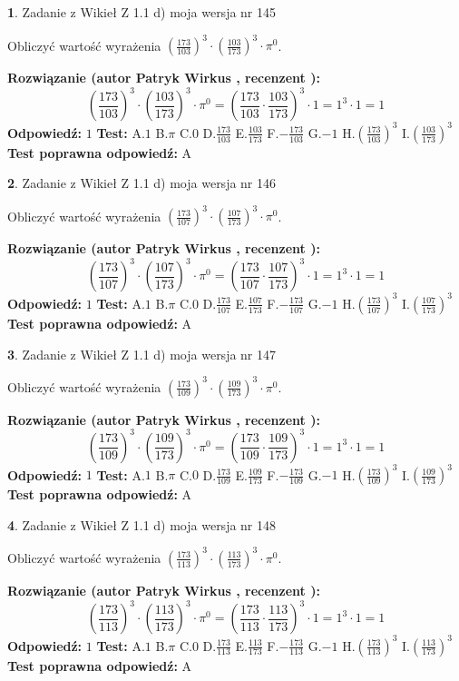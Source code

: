 \documentclass[12pt, a4paper]{article}
\theoremstyle{definition} %
\newtheorem{zad}{}
\newcommand{\zadStart}[1]{\begin{zad}#1\newline}
\newcommand{\zadStop}{\end{zad}}
\newcommand{\rozwStart}[2]{\noindent \textbf{Rozwiązanie (autor #1 , recenzent #2): }\newline}
\newcommand{\rozwStop}{\newline}
\newcommand{\odpStart}{\noindent \textbf{Odpowiedź:}\newline}
\newcommand{\odpStop}{\newline}
\newcommand{\testStart}{\noindent \textbf{Test:}\newline}
\newcommand{\testStop}{\newline}
\newcommand{\kluczStart}{\noindent \textbf{Test poprawna odpowiedź:}\newline}
\newcommand{\kluczStop}{\newline}
\begin{document}
\zadStart{Zadanie z Wikieł Z 1.1 d) moja wersja nr 145}

Obliczyć wartość wyrażenia $(\frac{173}{103})^{3} \cdot (\frac{103}{173})^{3} \cdot \pi^{0}$.
\zadStop
\rozwStart{Patryk Wirkus}{}
$$(\frac{173}{103})^{3} \cdot (\frac{103}{173})^{3} \cdot \pi^{0} = (\frac{173}{103} \cdot \frac{103}{173})^{3} \cdot 1 = 1^{3} \cdot 1 = 1$$
\rozwStop
\odpStart
$1$
\odpStop
\testStart
A.$1$ B.$\pi$ C.$0$ D.$\frac{173}{103}$ E.$\frac{103}{173}$
F.$-\frac{173}{103}$ G.$-1$
H.$(\frac{173}{103})^{3}$
I.$(\frac{103}{173})^{3}$
\testStop
\kluczStart
A
\kluczStop



\zadStart{Zadanie z Wikieł Z 1.1 d) moja wersja nr 146}

Obliczyć wartość wyrażenia $(\frac{173}{107})^{3} \cdot (\frac{107}{173})^{3} \cdot \pi^{0}$.
\zadStop
\rozwStart{Patryk Wirkus}{}
$$(\frac{173}{107})^{3} \cdot (\frac{107}{173})^{3} \cdot \pi^{0} = (\frac{173}{107} \cdot \frac{107}{173})^{3} \cdot 1 = 1^{3} \cdot 1 = 1$$
\rozwStop
\odpStart
$1$
\odpStop
\testStart
A.$1$ B.$\pi$ C.$0$ D.$\frac{173}{107}$ E.$\frac{107}{173}$
F.$-\frac{173}{107}$ G.$-1$
H.$(\frac{173}{107})^{3}$
I.$(\frac{107}{173})^{3}$
\testStop
\kluczStart
A
\kluczStop



\zadStart{Zadanie z Wikieł Z 1.1 d) moja wersja nr 147}

Obliczyć wartość wyrażenia $(\frac{173}{109})^{3} \cdot (\frac{109}{173})^{3} \cdot \pi^{0}$.
\zadStop
\rozwStart{Patryk Wirkus}{}
$$(\frac{173}{109})^{3} \cdot (\frac{109}{173})^{3} \cdot \pi^{0} = (\frac{173}{109} \cdot \frac{109}{173})^{3} \cdot 1 = 1^{3} \cdot 1 = 1$$
\rozwStop
\odpStart
$1$
\odpStop
\testStart
A.$1$ B.$\pi$ C.$0$ D.$\frac{173}{109}$ E.$\frac{109}{173}$
F.$-\frac{173}{109}$ G.$-1$
H.$(\frac{173}{109})^{3}$
I.$(\frac{109}{173})^{3}$
\testStop
\kluczStart
A
\kluczStop



\zadStart{Zadanie z Wikieł Z 1.1 d) moja wersja nr 148}

Obliczyć wartość wyrażenia $(\frac{173}{113})^{3} \cdot (\frac{113}{173})^{3} \cdot \pi^{0}$.
\zadStop
\rozwStart{Patryk Wirkus}{}
$$(\frac{173}{113})^{3} \cdot (\frac{113}{173})^{3} \cdot \pi^{0} = (\frac{173}{113} \cdot \frac{113}{173})^{3} \cdot 1 = 1^{3} \cdot 1 = 1$$
\rozwStop
\odpStart
$1$
\odpStop
\testStart
A.$1$ B.$\pi$ C.$0$ D.$\frac{173}{113}$ E.$\frac{113}{173}$
F.$-\frac{173}{113}$ G.$-1$
H.$(\frac{173}{113})^{3}$
I.$(\frac{113}{173})^{3}$
\testStop
\kluczStart
A
\kluczStop
\end{document}
